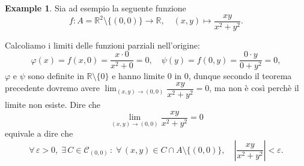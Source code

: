 \documentclass{article}
\theoremstyle{plain}
\theoremstyle{definition}
\newtheorem{exmp}{Example}[section]
\theoremstyle{remark}
\begin{document}
\vspace{10pt}

\begin{exmp} 
    Sia ad esempio la seguente funzione 
    \[f:A=\mathbb{R}^2\setminus\{(0,0)\}\to\mathbb{R},\quad (x,y)\mapsto\dfrac{xy}{x^2+y^2}.\]
    \begin{center}
        \hspace{1cm}
    \end{center}
    Calcoliamo i limiti delle funzioni parziali nell'origine: 
    \[\varphi(x)=f(x,0)=\dfrac{x\cdot0}{x^2+0}=0,\quad\psi(y)=f(0,y)=\dfrac{0\cdot y}{0+y^2}=0,\]
    $\varphi$ e $\psi$ sono definite in $\mathbb{R}\setminus\{0\}$ e hanno limite $0$ in $0$, dunque secondo il teorema precedente dovremo avere $\lim_{(x,y)\to(0,0)}\dfrac{xy}{x^2+y^2}=0$, ma non è così perchè il limite non esiste.
    Dire che 
    \[\lim_{(x,y)\to(0,0)}\dfrac{xy}{x^2+y^2}=0\]
    equivale a dire che 
    \[\forall\,\varepsilon>0,\;\exists\,C\in\mathcal{C}_{(0,0)}\,:\;\forall\,(x,y)\in C\cap A\setminus\{(0,0)\},\quad\left|\dfrac{xy}{x^2+y^2}\right|<\varepsilon.\]

\end{exmp}
\end{document}
